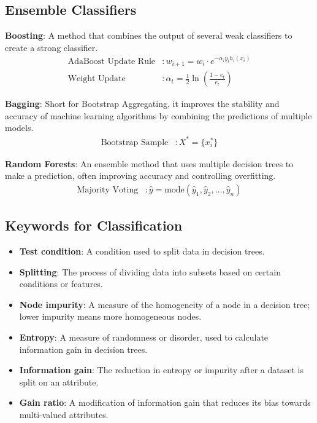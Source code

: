 \documentclass{article}
\begin{document}
\subsection{Ensemble Classifiers}
\textbf{Boosting}: A method that combines the output of several weak classifiers to create a strong classifier.
\begin{align*}
    \text{AdaBoost Update Rule} &: w_{i+1} = w_i \cdot e^{- \alpha_i y_i h_i(x_i)} \\
    \text{Weight Update} &: \alpha_t = \frac{1}{2} \ln \left( \frac{1 - e_t}{e_t} \right)
\end{align*}

\textbf{Bagging}: Short for Bootstrap Aggregating, it improves the stability and accuracy of machine learning algorithms by combining the predictions of multiple models.
\begin{align*}
    \text{Bootstrap Sample} &: X^* = \{ x_i^* \}
\end{align*}

\textbf{Random Forests}: An ensemble method that uses multiple decision trees to make a prediction, often improving accuracy and controlling overfitting.
\begin{align*}
    \text{Majority Voting} &: \hat{y} = \text{mode}(\hat{y}_1, \hat{y}_2, \ldots, \hat{y}_n)
\end{align*}

\subsection{Keywords for Classification}
\begin{itemize}
    \item \textbf{Test condition}: A condition used to split data in decision trees.
    \item \textbf{Splitting}: The process of dividing data into subsets based on certain conditions or features.
    \item \textbf{Node impurity}: A measure of the homogeneity of a node in a decision tree; lower impurity means more homogeneous nodes.
    \item \textbf{Entropy}: A measure of randomness or disorder, used to calculate information gain in decision trees.
    \item \textbf{Information gain}: The reduction in entropy or impurity after a dataset is split on an attribute.
    \item \textbf{Gain ratio}: A modification of information gain that reduces its bias towards multi-valued attributes.
\end{itemize}
\end{document}
